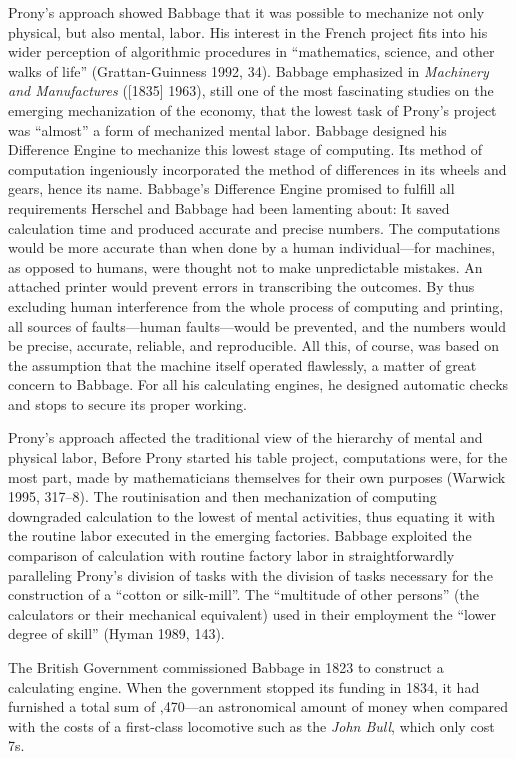 \documentclass[version=last,draft=true,paper=A4,portrait,twoside=true,twocolumn=false,headinclude=false,footinclude=false,fontsize=12,BCOR=20mm,DIV=calc,pagesize=auto,titlepage=firstiscover,mpinclude=true,open=right,chapterprefix=true,numbers=autoendperiod,headsepline=false,headings=twolinechapter,parskip=false]{scrbook}
\begin{document}
Prony's approach showed Babbage that it was possible to mechanize not only
physical, but also mental, labor. His interest in the French project fits
into his wider perception of algorithmic procedures in ``mathematics,
science, and other walks of life'' (Grattan-Guinness 1992, 34). Babbage
emphasized in \emph{Machinery and Manufactures} ([1835] 1963), still one of the
most fascinating studies on the emerging mechanization of the economy,
that the lowest task of Prony's project was ``almost'' a form of
mechanized mental labor. Babbage designed his Difference Engine to
mechanize this lowest stage of computing. Its method of computation
ingeniously incorporated the method of differences in its wheels and
gears, hence its name. Babbage's Difference Engine promised to fulfill all
requirements Herschel and Babbage had been lamenting about: It saved
calculation time and produced accurate and precise numbers. The
computations would be more accurate than when done by a human
individual---for machines, as opposed to humans, were thought not to make
unpredictable mistakes. An attached printer would prevent errors in
transcribing the outcomes. By thus excluding human interference from the
whole process of computing and printing, all sources of faults---human
faults---would be prevented, and the numbers would be precise, accurate,
reliable, and reproducible. All this, of course, was based on the
assumption that the machine itself operated flawlessly, a matter of great
concern to Babbage. For all his calculating engines, he designed automatic
checks and stops to secure its proper working.

Prony's approach affected the traditional view of the hierarchy of mental
and physical labor, Before Prony started his table project, computations
were, for the most part, made by mathematicians themselves for their own
purposes (Warwick 1995, 317--8). The routinisation and then mechanization
of computing downgraded calculation to the lowest of mental activities,
thus equating it with the routine labor executed in the emerging factories.
Babbage exploited the comparison of calculation with routine factory labor
in straightforwardly paralleling Prony's division of tasks with the
division of tasks necessary for the construction of a ``cotton or
silk-mill''. The ``multitude of other persons'' (the calculators or their
mechanical equivalent) used in their employment the ``lower degree of
skill'' (Hyman  1989, 143).

The British Government commissioned Babbage in 1823 to construct a
calculating engine. When the government stopped its funding in 1834, it had
furnished a total sum of ,470---an astronomical amount of
money when compared with the costs of a first-class locomotive such as the
\emph{John Bull}, which only cost  7s. 
\end{document}
